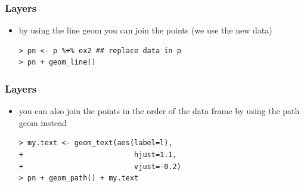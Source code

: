 \documentclass[xcolor={table},c]{beamer}
\begin{document}
\begin{frame}[fragile]\frametitle{Layers}
  \begin{itemize}
  \item by using the line geom you can join the points (we use the new data)
\begin{verbatim}
> pn <- p %+% ex2 ## replace data in p
> pn + geom_line()
\end{verbatim}
  \end{itemize}
\begin{center}
\end{center}
\end{frame}

\begin{frame}[fragile]\frametitle{Layers}
  \begin{itemize}
  \item you can also join the points in the order of the data frame by using the path geom instead\footnotesize
\begin{verbatim}
> my.text <- geom_text(aes(label=l), 
+                          hjust=1.1, 
+                          vjust=-0.2)
> pn + geom_path() + my.text
\end{verbatim}
  \end{itemize}
\begin{center}
\end{center}
\end{frame}
\end{document}
